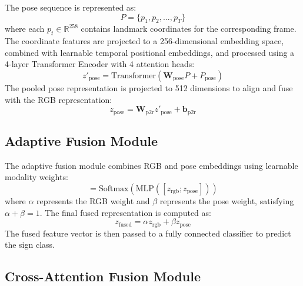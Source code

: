 \documentclass[conference]{IEEEtran}
\begin{document}
The pose sequence is represented as:
\begin{equation}
P = \{p_1, p_2, ..., p_T\}
\end{equation}
where each $p_t \in \mathbb{R}^{258}$ contains landmark coordinates for the corresponding frame. The coordinate features are projected to a 256-dimensional embedding space, combined with learnable temporal positional embeddings, and processed using a 4-layer Transformer Encoder with 4 attention heads:
\begin{equation}
z'_{\text{pose}} = \text{Transformer}(\mathbf{W}_{\text{pose}}P + P_{\text{pose}})
\end{equation}
The pooled pose representation is projected to 512 dimensions to align and fuse with the RGB representation:
\begin{equation}
z_{\text{pose}} = \mathbf{W}_{\text{p2r}} z'_{\text{pose}} + \mathbf{b}_{\text{p2r}}
\end{equation}

\subsection{Adaptive Fusion Module}

The adaptive fusion module combines RGB and pose embeddings using learnable modality weights:
\begin{equation}
[\alpha,\beta] = \text{Softmax}(\text{MLP}([z_{\text{rgb}};z_{\text{pose}}]))
\end{equation}
where $\alpha$ represents the RGB weight and $\beta$ represents the pose weight, satisfying $\alpha + \beta = 1$. The final fused representation is computed as:
\begin{equation}
z_{\text{fused}} = \alpha z_{\text{rgb}} + \beta z_{\text{pose}}
\end{equation}
The fused feature vector is then passed to a fully connected classifier to predict the sign class.

\subsection{Cross-Attention Fusion Module}
\end{document}
